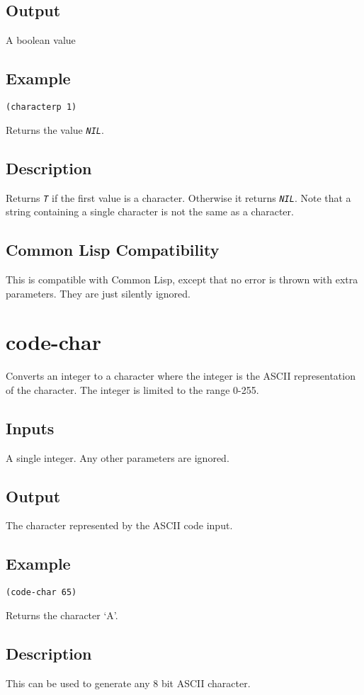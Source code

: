 \documentclass[10pt, openany]{book}
\newcommand{\constant}[1]{\emph{\texttt{#1}}}
\newcommand{\cl}{Common Lisp}
\begin{document}
\subsection{Output}
A boolean value
\subsection{Example}
\begin{lstlisting}
(characterp 1)
\end{lstlisting}
Returns the value \constant{NIL}.
\subsection{Description}
Returns \constant{T} if the first value is a character.  Otherwise it returns \constant{NIL}.  Note that a string containing a single character is not the same as a character.
\subsection{Common Lisp Compatibility}
This is compatible with \cl, except that no error is thrown with extra parameters.  They are just silently ignored.

\section{code-char}
Converts an integer to a character where the integer is the ASCII representation of the character.  The integer is limited to the range 0-255.
\subsection{Inputs}
A single integer.  Any other parameters are ignored.
\subsection{Output}
The character represented by the ASCII code input.
\subsection{Example}
\begin{lstlisting}
(code-char 65)
\end{lstlisting}
Returns the character `A'.
\subsection{Description}
This can be used to generate any 8 bit ASCII character.
\end{document}
